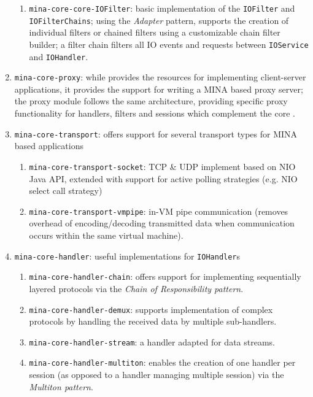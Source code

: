 \begin{enumerate}
\begin{enumerate}
            \item \texttt{mina-core-core-IOFilter}: basic implementation of the \texttt{IOFilter} and \texttt{IOFilterChains}; using the \textit{Adapter} pattern, supports the creation of individual filters or chained filters using a customizable chain filter builder; a filter chain filters all IO events and requests between \texttt{IOService} and \texttt{IOHandler}.
        \end{enumerate}
    \item \texttt{mina-core-proxy}: while  provides the resources for implementing client-server applications, it provides the support for writing a MINA based proxy server; the proxy module follows the same architecture, providing specific proxy functionality for handlers, filters and sessions which complement the core .
    \item \texttt{mina-core-transport}: offers support for several transport types for MINA based applications
        \begin{enumerate}
            \item \texttt{mina-core-transport-socket}: TCP \& UDP implement based on NIO Java API, extended with support for active polling strategies (e.g. NIO select call strategy)
            \item \texttt{mina-core-transport-vmpipe}: in-VM pipe communication (removes overhead of encoding/decoding transmitted data when communication occurs within the same virtual machine).
        \end{enumerate} 
    \item \texttt{mina-core-handler}: useful implementations for \texttt{IOHandler}s
        \begin{enumerate}
            \item \texttt{mina-core-handler-chain}: offers support for implementing sequentially layered protocols via the \textit{Chain of Responsibility pattern}.
            \item \texttt{mina-core-handler-demux}: supports implementation of complex protocols by handling the received data by multiple sub-handlers.
            \item \texttt{mina-core-handler-stream}: a handler adapted for data streams.
            \item \texttt{mina-core-handler-multiton}: enables the creation of one handler per session (as opposed to a handler managing multiple session) via the \textit{Multiton pattern}.
        \end{enumerate}

\end{enumerate}
